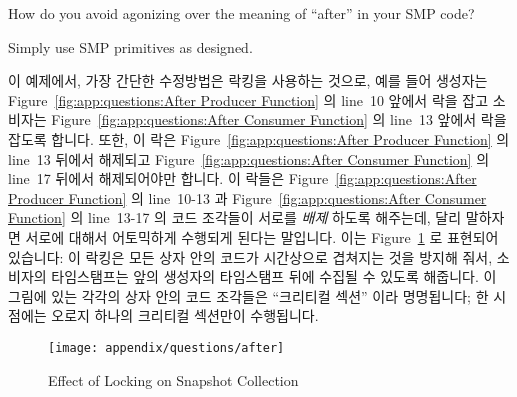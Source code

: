 How do you avoid agonizing over the meaning of ``after'' in your
SMP code?

Simply use SMP primitives as designed.
\fi

이 예제에서, 가장 간단한 수정방법은 락킹을 사용하는 것으로, 예를 들어 생성자는
Figure~\ref{fig:app:questions:After Producer Function} 의 line~10 앞에서 락을
잡고 소비자는
Figure~\ref{fig:app:questions:After Consumer Function} 의 line~13 앞에서 락을
잡도록 합니다.
또한, 이 락은
Figure~\ref{fig:app:questions:After Producer Function} 의 line~13 뒤에서
해제되고
Figure~\ref{fig:app:questions:After Consumer Function} 의 line~17 뒤에서
해제되어야만 합니다.
이 락들은
Figure~\ref{fig:app:questions:After Producer Function} 의 line~10-13 과
Figure~\ref{fig:app:questions:After Consumer Function} 의 line~13-17 의 코드
조각들이 서로를 {\em 배제} 하도록 해주는데, 달리 말하자면 서로에 대해서
어토믹하게 수행되게 된다는 말입니다.
이는
Figure~\ref{fig:app:questions:Effect of Locking on Snapshot Collection} 로
표현되어 있습니다:
이 락킹은 모든 상자 안의 코드가 시간상으로 겹쳐지는 것을 방지해 줘서, 소비자의
타임스탬프는 앞의 생성자의 타임스탬프 뒤에 수집될 수 있도록 해줍니다.
이 그림에 있는 각각의 상자 안의 코드 조각들은 ``크리티컬 섹션'' 이라
명명됩니다; 한 시점에는 오로지 하나의 크리티컬 섹션만이 수행됩니다.
\iffalse

In this example, the easiest fix is to use locking, for example,
acquire a lock in the producer before line~10 in
Figure~\ref{fig:app:questions:After Producer Function} and in
the consumer before line~13 in
Figure~\ref{fig:app:questions:After Consumer Function}.
This lock must also be released after line~13 in
Figure~\ref{fig:app:questions:After Producer Function} and
after line~17 in
Figure~\ref{fig:app:questions:After Consumer Function}.
These locks cause the code segments in lines~10-13 of
Figure~\ref{fig:app:questions:After Producer Function} and in lines~13-17 of
Figure~\ref{fig:app:questions:After Consumer Function} to {\em exclude}
each other, in other words, to run atomically with respect to each other.
This is represented in
Figure~\ref{fig:app:questions:Effect of Locking on Snapshot Collection}:
the locking prevents any of the boxes of code from overlapping in time, so
that the consumer's timestamp must be collected after the prior
producer's timestamp.
The segments of code in each box in this figure are termed
``critical sections''; only one such critical section may be executing
at a given time.
\fi

\begin{figure}[htb]
\centering
\texttt{[image: appendix/questions/after]}
\caption{Effect of Locking on Snapshot Collection}
\label{fig:app:questions:Effect of Locking on Snapshot Collection}
\end{figure}

